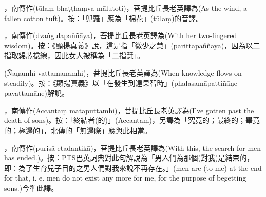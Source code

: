 \startitemgroup[noteitems]
\item{}，南傳作(tūlaṃ bhaṭṭhaṃva mālutoti)，菩提比丘長老英譯為(As the wind, a fallen cotton tuft)。按：「兜羅」應為「棉花」(tūlaṃ)的音譯。
\stopitemgroup

\startitemgroup[noteitems]
\item{}，南傳作(dvaṅgulapaññāya)，菩提比丘長老英譯為(With her two-fingered wisdom)。按：《顯揚真義》說，這是指「微少之慧」(parittapaññāya)，因為以二指取綿芯捻線，因此女人被稱為「二指慧」。
\stopitemgroup

\startitemgroup[noteitems]
\item{}(Ñāṇamhi vattamānamhi)，菩提比丘長老英譯為(When knowledge flows on steadily)。按：《顯揚真義》以「在發生到達果智時」(phalasamāpattiñāṇe pavattamāne)解說。
\stopitemgroup

\startitemgroup[noteitems]
\item{}，南傳作(Accantaṃ mataputtāmhi)，菩提比丘長老英譯為(I've gotten past the death of sons)。按：「終結者(的)」(Accantaṃ)，另譯為「究竟的；最終的；畢竟的；極邊的」，北傳的「無邊際」應與此相當。
\stopitemgroup

\startitemgroup[noteitems]
\item{}，南傳作(purisā etadantikā)，菩提比丘長老英譯為(With this, the search for men has ended.)。按：PTS巴英詞典對此句解說為「男人們為那個(對我)是結束的，即：為了生育兒子目的之男人們對我來說不再存在。」(men are (to me) at the end for that, i. e. men do not exist any more for me, for the purpose of begetting sons.)今準此譯。
\stopitemgroup

